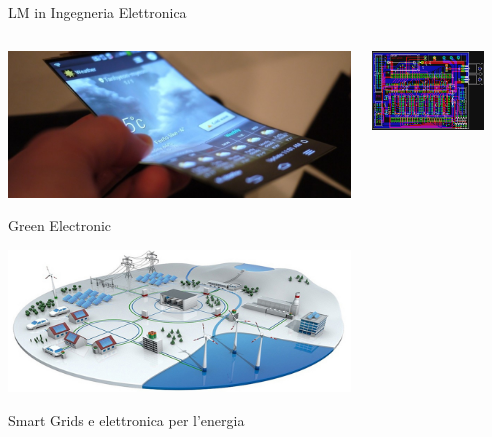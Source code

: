 \documentclass{beamer}
\begin{document}
	\begin{frame}{LM in Ingegneria Elettronica}
		\begin{columns}
			\begin{column}{0.4\textwidth}
				\centering
				\includegraphics[width=\textwidth]{oled-lg.jpeg}

				Green Electronic

				\vspace{0.7cm}
				\includegraphics[width=\textwidth]{smart_grid.jpeg}

				Smart Grids e elettronica per l'energia
			\end{column}
			\begin{column}{0.4\textwidth}
				\centering
				\includegraphics[width=0.8\textwidth]{prog_integr.jpeg}


\end{column}
\end{columns}
\end{frame}
\end{document}
